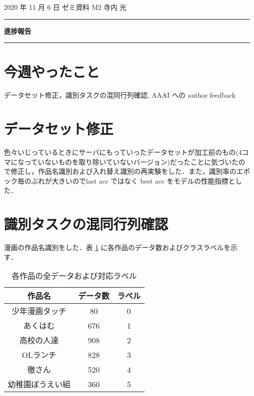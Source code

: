 \documentclass[onecolumn]{ujarticle}   %
\begin{document}
	\noindent

	\hspace{1em}
	2020 年 11 月 6 日
	ゼミ資料
	\hfill
	M2 寺内 光

	\vspace{2mm}

	\hrule

	\begin{center}
		{\Large \bf 進捗報告}
	\end{center}

	\hrule
	\vspace{3mm}

	\section{今週やったこと}
	データセット修正，識別タスクの混同行列確認, AAAI への author feedback

  \section{データセット修正}
  色々いじっているときにサーバにもっていったデータセットが加工前のもの(4コマになっていないものを取り除いていないバージョン)だったことに気づいたので修正し，作品名識別および入れ替え識別の再実験をした．また，識別率のエポック毎のぶれが大きいのでlast acc ではなく best acc をモデルの性能指標とした．

  \section{識別タスクの混同行列確認}
  漫画の作品名識別をした．表 \ref{tab:num_data} に各作品のデータ数およびクラスラベルを示す．

  \begin{table}[h]
  	\centering
  	\caption{各作品の全データおよび対応ラベル}
  	\label{tab:num_data}
  	\begin{tabular}{|c||c|c|} \hline
      作品名&データ数&ラベル \\ \hline
      少年漫画タッチ&80&0\\ \hline
      あくはむ&676&1\\ \hline
      高校の人達&908&2\\ \hline
      OLランチ&828&3\\ \hline
      徹さん&520&4\\ \hline
      幼稚園ぼうえい組&360&5\\ \hline
  	\end{tabular}
  \end{table}
\end{document}
